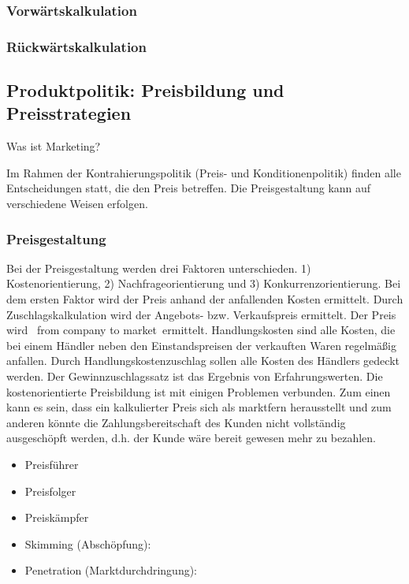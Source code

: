 \subsubsection{Vorwärtskalkulation}
\subsubsection{Rückwärtskalkulation}


\subsection{Produktpolitik: Preisbildung und Preisstrategien}

Was ist Marketing?

Im Rahmen der Kontrahierungspolitik (Preis- und Konditionenpolitik) finden alle Entscheidungen statt, die den Preis betreffen. Die Preisgestaltung kann auf verschiedene Weisen erfolgen.

\subsubsection{Preisgestaltung}

Bei der Preisgestaltung werden drei Faktoren unterschieden. 1) Kostenorientierung, 2) Nachfrageorientierung und 3) Konkurrenzorientierung. Bei dem ersten Faktor wird der Preis anhand der anfallenden Kosten ermittelt. Durch Zuschlagskalkulation wird der Angebots- bzw. Verkaufspreis ermittelt. Der Preis wird \qr\ from company to market\qr\ ermittelt. Handlungskosten sind alle Kosten, die bei einem Händler neben den Einstandspreisen der verkauften Waren regelmäßig anfallen. Durch Handlungskostenzuschlag sollen alle Kosten des Händlers gedeckt werden. Der Gewinnzuschlagssatz ist das Ergebnis von Erfahrungswerten. Die kostenorientierte Preisbildung ist mit einigen Problemen verbunden. Zum einen kann es sein, dass ein kalkulierter Preis sich als marktfern herausstellt und zum anderen könnte die Zahlungsbereitschaft des Kunden nicht vollständig ausgeschöpft werden, d.h. der Kunde wäre bereit gewesen mehr zu bezahlen.

\begin{itemize}
	\item Preisführer
	\item Preisfolger
	\item Preiskämpfer
\end{itemize}



\begin{itemize}
	\item Skimming (Abschöpfung):
	\item Penetration (Marktdurchdringung):
\end{itemize}

